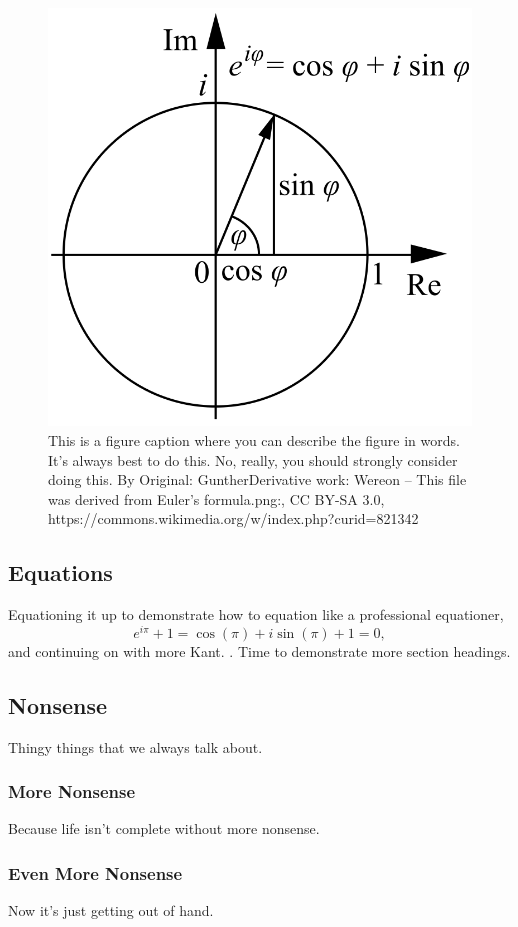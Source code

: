 \documentclass{cs19proc}
\begin{document}
\begin{figure}[ht]
	\centering
	\includegraphics[width=0.45\linewidth]{example/Euler.png}
	\caption{This is a figure caption where you can describe the figure in words. It's always best to do this. No, really, you should strongly consider doing this. By Original: GuntherDerivative work: Wereon -- This file was derived from Euler's formula.png:, CC BY-SA 3.0, https://commons.wikimedia.org/w/index.php?curid=821342}
	\label{fig:fig_wide}
\end{figure}

\subsection{Equations}
Equationing it up to demonstrate how to equation like a professional equationer,
\begin{equation}
	e^{i\pi} + 1 = \cos(\pi) + i\sin(\pi) + 1 = 0,
\end{equation}
and continuing on with more Kant. \kant. Time to demonstrate more section headings.

\subsection{Nonsense}

Thingy things that we always talk about.

\subsubsection{More Nonsense}

Because life isn't complete without more nonsense.

\subsubsection{Even More Nonsense}

Now it's just getting out of hand.
\end{document}
